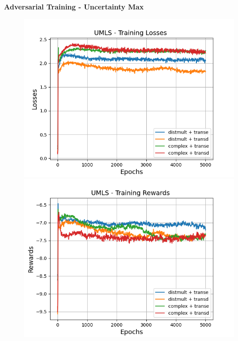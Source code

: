 \textbf{Adversarial Training - Uncertainty Max}\\
\begin{figure}
    \centering
    \begin{minipage}{.5\textwidth}
      \centering
      \includegraphics[width=0.9\linewidth]{figures/results/gan_train/pretrained/uncertainty/max/entropy/umls/gan_train_uncertainty_umls_losses.png}
    \end{minipage}%
    \begin{minipage}{.5\textwidth}
      \centering
      \includegraphics[width=0.9\linewidth]{figures/results/gan_train/pretrained/uncertainty/max/entropy/umls/gan_train_uncertainty_umls_rewards.png}
    \end{minipage}
    \begin{minipage}{.5\textwidth}
      \centering

\end{minipage}
\end{figure}
